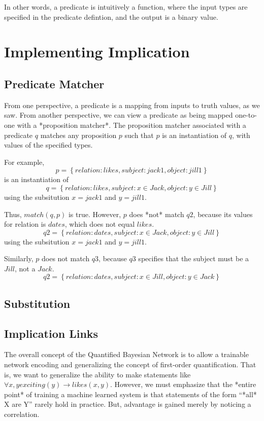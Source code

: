 \documentclass[12pt]{article}
\begin{document}
In other words, a predicate is intuitively a function, where the input types are specified in the predicate defintion, and the output is a binary value.


\section{Implementing Implication}
\subsection{Predicate Matcher}
From one perspective, a predicate is a mapping from inputs to truth values, as we saw.
From another perspective, we can view a predicate as being mapped one-to-one with a *proposition matcher*.
The proposition matcher associated with a predicate $q$ matches any proposition $p$ such that $p$ is an instantiation of $q$, with values of the specified types.

For example, 
\[ p = \left\{relation:likes, subject:jack1, object:jill1 \right\} \]
is an instantiation of
\[ q = \left\{relation:likes, subject:{x \in Jack}, object:{y \in Jill} \right\} \]
using the subsitution $x=jack1$ and $y=jill1$.

Thus, $match(q, p)$ is true.
However, $p$ does *not* match $q2$, because its values for relation is $dates$, which does not equal $likes$.
\[ q2 = \left\{relation:dates, subject:{x \in Jack}, object:{y \in Jill} \right\} \]
using the subsitution $x=jack1$ and $y=jill1$.

Similarly, $p$ does not match $q3$, because $q3$ specifies that the subject must be a $Jill$, not a $Jack$.
\[ q2 = \left\{relation:dates, subject:{x \in Jill}, object:{y \in Jack} \right\} \]

\subsection{Substitution}
\subsection{Implication Links}
The overall concept of the Quantified Bayesian Network is to allow a trainable network encoding and generalizing the concept of first-order quantification.
That is, we want to generalize the ability to make statements like $\forall x, y exciting(y) \rightarrow likes(x, y)$.
However, we must emphasize that the *entire point* of training a machine learned system is that statements of the form ``*all* X are Y'' rarely hold in practice.
But, advantage is gained merely by noticing a correlation.
\end{document}
